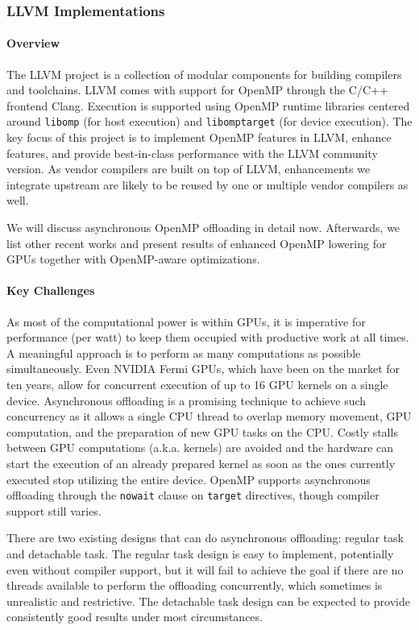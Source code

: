 \subsubsection{ LLVM Implementations}

\paragraph{Overview}
The LLVM project is a collection of modular components for building compilers and toolchains.
LLVM comes with support for OpenMP through the C/C++ frontend Clang.
Execution is supported using OpenMP runtime libraries centered around \texttt{libomp} (for host execution) and \texttt{libomptarget} (for device execution).
The key focus of this project is to implement OpenMP features in LLVM, enhance features, and provide best-in-class performance with the LLVM community version.
As vendor compilers are built on top of LLVM, enhancements we integrate upstream are likely to be reused
by one or multiple vendor compilers as well.

We will discuss asynchronous OpenMP offloading in detail now.
Afterwards, we list other recent works and present results of enhanced
OpenMP lowering for GPUs together with OpenMP-aware optimizations.

\paragraph{Key Challenges}

As most of the computational power is within GPUs, it is imperative for performance (per watt) to keep them occupied with productive work at all times. A meaningful approach is to perform as many computations as possible simultaneously. Even NVIDIA Fermi GPUs, which have been on the market for ten years, allow for concurrent execution of up to 16 GPU kernels on a single device. Asynchronous offloading is a promising technique to achieve such concurrency as it allows a single CPU thread to overlap memory movement, GPU computation, and the preparation of new GPU tasks on the CPU.
Costly stalls between GPU computations (a.k.a. kernels) are avoided and the hardware can start the execution of an already prepared kernel as soon as the ones currently executed stop utilizing the entire device. OpenMP supports asynchronous offloading through the \texttt{nowait} clause on \texttt{target} directives, though compiler support still varies.

There are two existing designs that can do asynchronous offloading: regular task and detachable task.
The regular task design is easy to implement, potentially even without compiler support, but it will fail to achieve the goal if there are no threads available to perform the offloading concurrently, which sometimes is unrealistic and restrictive.
The detachable task design can be expected to provide consistently good results under most circumstances.

